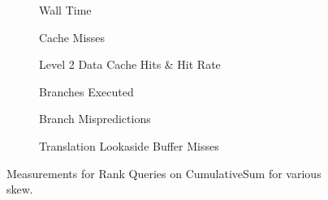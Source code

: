 \begin{figure}\tiny

\begin{subfigure}{0.48\textwidth}
	
	\caption{Wall Time}
	\label{fig:CumulativeSumSkew_n8as16_Rank}
\end{subfigure}
\hfill
\begin{subfigure}{0.48\textwidth}
	
	\caption{Cache Misses}
	\label{fig:CumulativeSumSkew_n8as16_Rank_CM}
\end{subfigure}

\begin{subfigure}{0.48\textwidth}
	
	\caption{Level 2 Data Cache Hits \& Hit Rate}
	\label{fig:CumulativeSumSkew_n8as16_Rank_L2CH}
\end{subfigure}
\hfill
\begin{subfigure}{0.48\textwidth}
	
	\caption{Branches Executed}
	\label{fig:CumulativeSumSkew_n8as16_Rank_BMExe}
\end{subfigure}

\begin{subfigure}{0.48\textwidth}
	
	\caption{Branch Mispredictions}
	\label{fig:CumulativeSumSkew_n8as16_Rank_BM}
\end{subfigure}
\hfill
\begin{subfigure}{0.48\textwidth}
	
	\caption{Translation Lookaside Buffer Misses}
	\label{fig:CumulativeSumSkew_n8as16_Rank_TLBM}
\end{subfigure}

\caption{Measurements for Rank Queries on CumulativeSum for various skew.}
\label{fig:CumulativeSumSkew_n8as16_Rank}
\end{figure}






